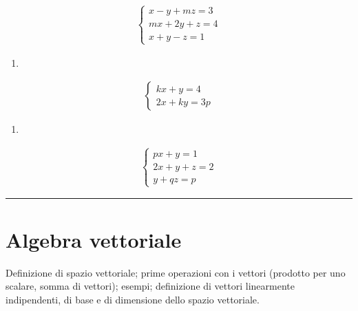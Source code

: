 \documentclass[letterpaper,10pt,italian]{jupyterBook}
\begin{document}
\begin{equation*}
\begin{split}
   \begin{cases}
   x - y + mz = 3 \\
   mx + 2y + z = 4 \\
   x + y - z = 1
   \end{cases}
\end{split}
\end{equation*}\begin{enumerate}
%
\setcounter{enumi}{3}
\item {} 
\end{enumerate}
\begin{equation*}
\begin{split}
   \begin{cases}
   kx + y = 4 \\
   2x + ky = 3 p
   \end{cases}
\end{split}
\end{equation*}\begin{enumerate}
%
\setcounter{enumi}{4}
\item {} 
\end{enumerate}
\begin{equation*}
\begin{split}
   \begin{cases}
   px + y      = 1 \\
   2x + y +  z = 2 \\
        y + qz = p
   \end{cases}
\end{split}
\end{equation*}
\sphinxAtStartPar
{} 




\bigskip\hrule\bigskip


\sphinxstepscope




\chapter{Algebra vettoriale}
\label{\detokenize{ch/algebra/vector-algebra:algebra-vettoriale}}\label{\detokenize{ch/algebra/vector-algebra:math-hs-algebra-vector}}\label{\detokenize{ch/algebra/vector-algebra::doc}}
\sphinxAtStartPar
{\hyperref[\detokenize{ch/algebra/vector-algebra-def:math-hs-algebra-vector-def}]{}} Definizione di spazio vettoriale; prime operazioni con i vettori (prodotto per uno scalare, somma di vettori); esempi; definizione di vettori linearmente indipendenti, di base e di dimensione dello spazio vettoriale.
\end{document}
